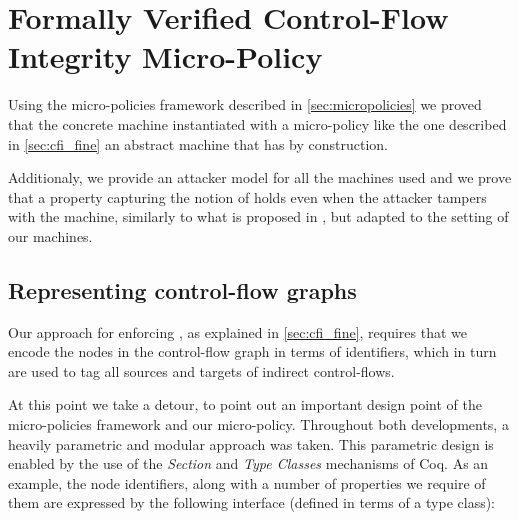 \chapter{Formally Verified Control-Flow Integrity Micro-Policy}\label{ch:verified_cfi}

Using the micro-policies framework described in \ref{sec:micropolicies} we 
proved that the concrete machine instantiated with a \CFI micro-policy like the
one described in \ref{sec:cfi_fine}  an abstract machine that has
\CFI by construction.

Additionaly, we provide an attacker model for all the machines used and we prove
that a property capturing the notion of \CFI holds even when the attacker
tampers with the machine, similarly to what is proposed in \cite{abadi2005}, but
adapted to the setting of our machines.

\section{Representing control-flow graphs}\label{sec:cfi_tags}

Our approach for enforcing \CFI, as explained in \ref{sec:cfi_fine}, requires
that we encode the nodes in the control-flow graph in terms of identifiers,
which in turn are used to tag all sources and targets of indirect control-flows.

At this point we take a detour, to point out an important design point of 
the micro-policies framework and our \CFI micro-policy.
Throughout both developments, a heavily parametric and modular approach was 
taken. This parametric design is enabled by the use of the \emph{Section} and
\emph{Type Classes} mechanisms of Coq. As an example, the node identifiers,
along with a number of properties we require of them are expressed by the
following interface (defined in terms of a type class):

